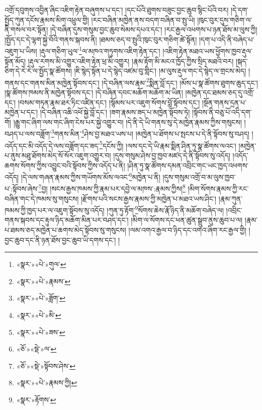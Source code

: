 འགྲོ་དབུགས་འབྱིན་ཞིང་འཇིག་རྟེན་བཞུགས་པ་དང་། །དང་པོའི་ཐུགས་བཟུང་བྱང་ཆུབ་སྙིང་པོའི་བར། །དེ་དག་སྤྱོད་ཀུན་དངོས་རྣམས་མིག་འཕྲུལ་གྱི། །རང་བཞིན་མཁྱེན་ནས་བདག་བཞིན་བ་སྤུ་ཡི། །ཁུང་བུར་དུས་གཅིག་ལ་ནི་གསལ་བར་སྟོན། །དེ་བཞིན་དུས་གསུམ་བྱང་ཆུབ་སེམས་དཔའ་དང་། །རང་རྒྱལ་འཕགས་པ་ཉན་ཐོས་མ་ལུས་ཀྱི། །སྤྱོད་དང་དེ་ལྷག་སྐྱེ་བོའི་གནས་སྐབས་ནི། །ཐམས་ཅད་བ་སྤུའི་ཁུང་བུར་གཅིག་ཚེ་སྟོན། །དག་པ་འདི་ནི་བཞེད་པ་འཇུག་པ་ཡིས། །རྡུལ་གཅིག་ཡུལ་\footnote{«སྣར་»«པེ་»གུལ་}ལ་མཁའ་གཏུགས་འཇིག་རྟེན་དང་། །འཇིག་རྟེན་མཐའ་ཡས་ཕྱོགས་ཁྱབ་རྡུལ་སྟོན་མོད། །རྡུལ་རགས་མི་འགྱུར་འཇིག་རྟེན་ཕྲ་མི་འགྱུར། །རྣམ་རྟོག་མི་མངའ་ཁྱོད་ཀྱིས་སྲིད་མཐའི་བར། །སྐད་ཅིག་དེ་རེ་རེ་ལ་སྤྱོད་སྣ་ཚོགས། །ཇི་སྙེད་སྟོན་པ་དེ་སྙེད་འཛམ་བུ་གླིང་། །མ་ལུས་རྡུལ་གང་དེ་སྙེད་ལ་གྲངས་མེད། །གནས་དང་གནས་མིན་མཁྱེན་སྟོབས་དང་། །དེ་བཞིན་ལས་རྣམ་\footnote{«སྣར་»«པེ་»རྣམས་}སྨིན་བློ་དང་། །མོས་པ་སྣ་ཚོགས་ཐུགས་ཆུད་དང་། །སྣ་ཚོགས་ཁམས་ནི་མཁྱེན་སྟོབས་དང་། །དེ་བཞིན་དབང་མཆོག་མཆོག་མ་ཡིན། །མཁྱེན་དང་ཐམས་ཅད་དུ་འགྲོ་དང་། །བསམ་གཏན་རྣམ་ཐར་ཏིང་འཛིན་དང་། །སྙོམས་པར་འཇུག་སོགས་བློ་སྟོབས་དང་། །སྔོན་གནས་དྲན་པ་མཁྱེན་པ་དང་། །དེ་བཞིན་འཆི་འཕོ་སྐྱེ་བློ་དང་། །ཟག་རྣམས་ཟད་པ་མཁྱེན་སྟོབས་ཏེ། །སྟོབས་ནི་བཅུ་པོ་འདི་དག་གོ། །རྒྱུ་གང་ཞིག་ལས་གང་ཞིག་ངེས་པར་སྐྱེ་འགྱུར་བ། །དེ་ནི་དེ་ཡི་གནས་སུ་དེ་མཁྱེན་རྣམས་ཀྱིས་གསུངས། །བཤད་པ་ལས་བཟློག་\footnote{«སྣར་»«པེ་»ཟློག་}གནས་མིན་\footnote{«སྣར་»«པེ་»མི་}ཤེས་བྱ་མཐའ་ཡས་པ། །མཁྱེན་པ་ཐོགས་པ་སྤངས་པ་དེ་ནི་སྟོབས་སུ་བཤད། །འདོད་དང་མི་འདོད་དེ་ལས་བཟློག་དང་ཟད་\footnote{«སྣར་»«པེ་»ཟས་}དངོས་ཀྱི། །ལས་དང་དེ་ཡི་རྣམ་སྨིན་ཤིན་ཏུ་སྣ་ཚོགས་ལའང་། །མཁྱེན་པ་ནུས་མཐུ་ཐོགས་མེད་སོ་སོར་འཇུག་འགྱུར་བ། །དུས་གསུམ་ཤེས་བྱ་ཁྱབ་མཛད་དེ་ནི་སྟོབས་སུ་འདོད། །འདོད་ཆགས་སོགས་ཀྱིས་འབྱུང་བའི་སྟོབས་ཀྱིས་འདོད་པ་ནི། །ཤིན་ཏུ་སྣ་ཚོགས་དམན་འབྲིང་གང་ཡང་ཁྱད་འཕགས་འདོད། །དེ་ལས་གཞན་རྣམས་ཀྱིས་གཡོགས་མོས་ལའང་\footnote{«ཅོ་»«སྡེ་»ལ་}མཁྱེན་པ་ནི། །དུས་གསུམ་འགྲོ་བ་མ་ལུས་ཁྱབ་པ་:སྟོབས་ཞེས་\footnote{«ཅོ་»«སྡེ་»སྟོབས་ཤེས་}བྱ། །སངས་རྒྱས་ཁམས་ཀྱི་རྣམ་པར་དབྱེ་ལ་མཁས་:རྣམས་ཀྱིས།\footnote{«སྣར་»«པེ་»རྣམས་ཀྱི།} །མིག་སོགས་རྣམས་ཀྱི་རང་བཞིན་གང་དེ་ཁམས་སུ་གསུངས། །རྫོགས་པའི་སངས་རྒྱས་རྣམས་ཀྱི་མཁྱེན་པ་མཐའ་ཡས་ཤིང་། །རྣམ་ཀུན་ཁམས་ཀྱི་ཁྱད་པར་ལ་འཇུག་སྟོབས་སུ་འདོད། །ཀུན་ཏུ་རྟོག་\footnote{«སྣར་»རྟོགས་}སོགས་ཆེས་རྣོ་ཉིད་ནི་མཆོག་བཞེད་ལ། །འབྲིང་གནས་སྐབས་དང་རྟུལ་ཉིད་མཆོག་མིན་པར་བཤད་དང་། །མིག་ལ་སོགས་དང་ཕན་ཚུན་སྒྲུབ་ནུས་ཆུབ་པ་ལ། །རྣམ་པ་ཐམས་ཅད་མཁྱེན་པ་ཆགས་མེད་སྟོབས་སུ་གསུངས། །ལམ་འགའ་རྒྱལ་བ་ཉིད་དང་འགའ་ཞིག་རང་རྒྱལ་གྱི། །བྱང་ཆུབ་དང་ནི་ཉན་ཐོས་བྱང་ཆུབ་ཡི་དགས་དང་། །
